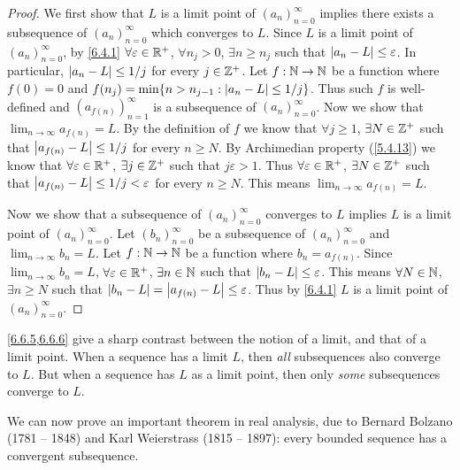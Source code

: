 \begin{proof}
  We first show that \(L\) is a limit point of \((a_n)_{n = 0}^\infty\) implies there exists a subsequence of \((a_n)_{n = 0}^\infty\) which converges to \(L\).
  Since \(L\) is a limit point of \((a_n)_{n = 0}^\infty\), by \cref{6.4.1} \(\forall \varepsilon \in \mathbb{R}^+\), \(\forall n_j > 0\), \(\exists n \geq n_j\) such that \(\left\lvert a_n - L\right\rvert \leq \varepsilon\).
  In particular, \(\left\lvert a_n - L\right\rvert \leq 1 / j\) for every \(j \in \mathbb{Z}^+\).
  Let \(f : \mathbb{N} \to \mathbb{N}\) be a function where \(f(0) = 0\) and \(f(n_j) = \min\{n > n_{j - 1} : \left\lvert a_n - L\right\rvert \leq 1 / j\}\).
  Thus such \(f\) is well-defined and \((a_{f(n)})_{n = 1}^\infty\) is a subsequence of \((a_n)_{n = 0}^\infty\).
  Now we show that \(\lim_{n \to \infty} a_{f(n)} = L\).
  By the definition of \(f\) we know that \(\forall j \geq 1\), \(\exists N \in \mathbb{Z}^+\) such that \(\left\lvert a_{f(n)} - L\right\rvert \leq 1 / j\) for every \(n \geq N\).
  By Archimedian property (\cref{5.4.13}) we know that \(\forall \varepsilon \in \mathbb{R}^+\), \(\exists j \in \mathbb{Z}^+\) such that \(j \varepsilon > 1\).
  Thus \(\forall \varepsilon \in \mathbb{R}^+\), \(\exists N \in \mathbb{Z}^+\) such that \(\left\lvert a_{f(n)} - L\right\rvert \leq 1 / j < \varepsilon\) for every \(n \geq N\).
  This means \(\lim_{n \to \infty} a_{f(n)} = L\).

  Now we show that a subsequence of \((a_n)_{n = 0}^\infty\) converges to \(L\) implies \(L\) is a limit point of \((a_n)_{n = 0}^\infty\).
  Let \((b_n)_{n = 0}^\infty\) be a subsequence of \((a_n)_{n = 0}^\infty\) and \(\lim_{n \to \infty} b_n = L\).
  Let \(f : \mathbb{N} \to \mathbb{N}\) be a function where \(b_n = a_{f(n)}\).
  Since \(\lim_{n \to \infty} b_n = L\), \(\forall \varepsilon \in \mathbb{R}^+\), \(\exists n \in \mathbb{N}\) such that \(\left\lvert b_n - L\right\rvert \leq \varepsilon\).
  This means \(\forall N \in \mathbb{N}\), \(\exists n \geq N\) such that \(\left\lvert b_n - L\right\rvert = \left\lvert a_{f(n)} - L\right\rvert \leq \varepsilon\).
  Thus by \cref{6.4.1} \(L\) is a limit point of \((a_n)_{n = 0}^\infty\).
\end{proof}

\begin{rmk}\label{6.6.7}
  \cref{6.6.5,6.6.6} give a sharp contrast between the notion of a limit, and that of a limit point.
  When a sequence has a limit \(L\), then \emph{all} subsequences also converge to \(L\).
  But when a sequence has \(L\) as a limit point, then only \emph{some} subsequences converge to \(L\).
\end{rmk}

\begin{note}
  We can now prove an important theorem in real analysis, due to Bernard Bolzano (1781 -- 1848) and Karl Weierstrass (1815 -- 1897):
  every bounded sequence has a convergent subsequence.
\end{note}

